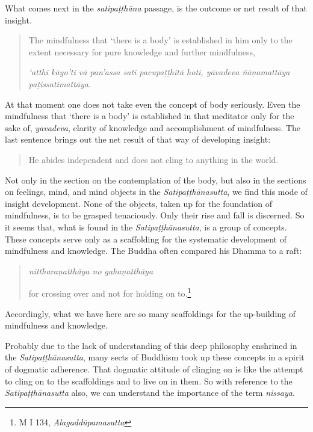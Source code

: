 What comes next in the \emph{satipaṭṭhāna} passage, is the outcome or net result of that insight.

\begin{quote}
The mindfulness that `there is a body' is established in him only to the extent necessary for pure knowledge and further mindfulness,

\emph{`atthi kāyo'ti vā pan'assa sati pacupaṭṭhitā hoti, yāvadeva ñāṇamattāya paṭissatimattāya}.
\end{quote}

At that moment one does not take even the concept of body seriously. Even the mindfulness that `there is a body' is established in that meditator only for the sake of, \emph{yavadeva}, clarity of knowledge and accomplishment of mindfulness. The last sentence brings out the net result of that way of developing insight:

\begin{quote}
He abides independent and does not cling to anything in the world.
\end{quote}

Not only in the section on the contemplation of the body, but also in the sections on feelings, mind, and mind objects in the \emph{Satipaṭṭhānasutta}, we find this mode of insight development. None of the objects, taken up for the foundation of mindfulness, is to be grasped tenaciously. Only their rise and fall is discerned. So it seems that, what is found in the \emph{Satipaṭṭhānasutta}, is a group of concepts. These concepts serve only as a scaffolding for the systematic development of mindfulness and knowledge. The Buddha often compared his Dhamma to a raft:

\begin{quote}
\emph{nittharaṇatthāya no gahaṇatthāya}

for crossing over and not for holding on to.\footnote{M I 134, \emph{Alagaddūpamasutta}}
\end{quote}

Accordingly, what we have here are so many scaffoldings for the up-building of mindfulness and knowledge.

Probably due to the lack of understanding of this deep philosophy enshrined in the \emph{Satipaṭṭhānasutta}, many sects of Buddhism took up these concepts in a spirit of dogmatic adherence. That dogmatic attitude of clinging on is like the attempt to cling on to the scaffoldings and to live on in them. So with reference to the \emph{Satipaṭṭhānasutta} also, we can understand the importance of the term \emph{nissaya}.
